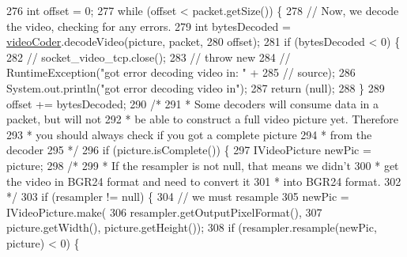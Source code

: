 \begin{DoxyCode}
276                 \textcolor{keywordtype}{int} offset = 0;
277                 \textcolor{keywordflow}{while} (offset < packet.getSize()) \{
278                     \textcolor{comment}{// Now, we decode the video, checking for any errors.}
279                     \textcolor{keywordtype}{int} bytesDecoded = \hyperlink{classworkspace_1_1_a_r_drone_capture_image_1_1src_1_1_drone_tools_ade856f1d7f4cc80de7a3f76b847c5c40}{videoCoder}.decodeVideo(picture, packet,
280                             offset);
281                     \textcolor{keywordflow}{if} (bytesDecoded < 0) \{
282                         \textcolor{comment}{// socket\_video\_tcp.close();}
283                         \textcolor{comment}{// throw new}
284                         \textcolor{comment}{// RuntimeException("got error decoding video in: " +}
285                         \textcolor{comment}{// source);}
286                         System.out.println(\textcolor{stringliteral}{"got error decoding video in"});
287                         \textcolor{keywordflow}{return} (null);
288                     \}
289                     offset += bytesDecoded;
290                     \textcolor{comment}{/*}
291 \textcolor{comment}{                     * Some decoders will consume data in a packet, but will not
}
292 \textcolor{comment}{                     * be able to construct a full video picture yet. Therefore
}
293 \textcolor{comment}{                     * you should always check if you got a complete picture
}
294 \textcolor{comment}{                     * from the decoder
}
295 \textcolor{comment}{                     */}
296                     \textcolor{keywordflow}{if} (picture.isComplete()) \{
297                         IVideoPicture newPic = picture;
298                         \textcolor{comment}{/*}
299 \textcolor{comment}{                         * If the resampler is not null, that means we didn't
}
300 \textcolor{comment}{                         * get the video in BGR24 format and need to convert it
}
301 \textcolor{comment}{                         * into BGR24 format.
}
302 \textcolor{comment}{                         */}
303                         \textcolor{keywordflow}{if} (resampler != null) \{
304                             \textcolor{comment}{// we must resample}
305                             newPic = IVideoPicture.make(
306                                     resampler.getOutputPixelFormat(),
307                                     picture.getWidth(), picture.getHeight());
308                             \textcolor{keywordflow}{if} (resampler.resample(newPic, picture) < 0) \{

\end{DoxyCode}
